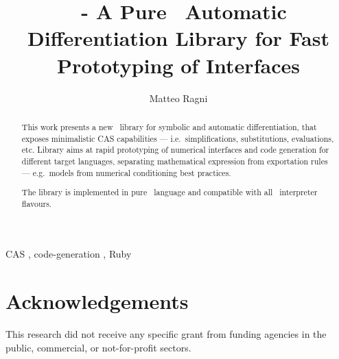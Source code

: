 \documentclass[preprint, 12pt, a4paper,review]{elsarticle}
\begin{document}
\begin{frontmatter}

\title{\ragnicas~- A Pure \Ruby~Automatic Differentiation Library for Fast Prototyping of Interfaces}

\author[ragni]{Matteo Ragni}
\address[ragni]{Department of Industrial Engineering, University of Trento, 9, Sommarive, Povo di Trento, Italy}

\begin{abstract}

This work presents a new \Ruby~library for symbolic and automatic differentiation, that exposes minimalistic CAS capabilities --- i.e.\ simplifications, substitutions, evaluations, etc. Library aims at rapid prototyping of numerical interfaces and code generation for different target languages, separating mathematical expression from exportation rules --- e.g.\ models from numerical conditioning best practices.

The library is implemented in pure \Ruby~language and compatible with all \Ruby~interpreter flavours.

\end{abstract}

\begin{keyword}
CAS \sep{} code-generation \sep{} Ruby
\end{keyword}

\end{frontmatter}

\linenumbers{}








\section*{Acknowledgements}
\label{sec:acknowledgements}
This research did not receive any specific grant from funding agencies in the public, commercial, or not-for-profit sectors.






\end{document}
